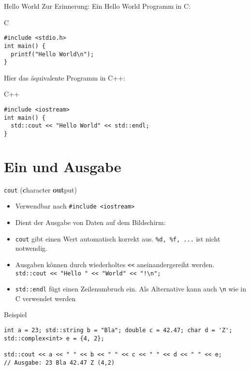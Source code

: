 \documentclass[presentation]{beamer}
\begin{document}
\begin{frame}[label={sec:org5a1b067},fragile]{Hello World}
 Zur Erinnerung: Ein Hello World Programm in C:
\begin{block}{C}
\begin{verbatim}
#include <stdio.h>
int main() {
  printf("Hello World\n");
}
\end{verbatim}
\end{block}
Hier das äquivalente Programm in C++:
\begin{block}{C++}
\begin{verbatim}
#include <iostream>
int main() {
  std::cout << "Hello World" << std::endl;
}
\end{verbatim}
\end{block}
\end{frame}
\section{Ein und Ausgabe}
\label{sec:org1da853d}
\begin{frame}[label={sec:orgd2dbbfe},fragile]{\texttt{cout} (\textbf{c}haracter \textbf{out}put)}
 \begin{itemize}
\item Verwendbar nach {\color{solarizedYellow}\verb!#include <iostream>!}
\item Dient der \alert{Ausgabe} von Daten auf dem Bildschirm: 
\item {\color{solarizedYellow}\verb!cout!} gibt einen Wert \alert{automatisch korrekt} aus. {\color{solarizedYellow}\verb!%d, %f, ...!}
ist nicht notwendig.
\item Ausgaben können durch wiederholtes {\color{solarizedYellow}\verb!<<!} aneinandergereiht werden.\newline
{\color{solarizedYellow}\verb|std::cout << "Hello " << "World" << "!\n";|}
\item {\color{solarizedYellow}\verb!std::endl!} fügt einen Zeilenumbruch ein. Als Alternative kann auch
{\color{solarizedYellow}\verb!\n!} wie in C verwendet werden
\end{itemize}
\begin{block}{Beispiel}
\begin{verbatim}
int a = 23; std::string b = "Bla"; double c = 42.47; char d = 'Z';
std::complex<int> e = {4, 2};

std::cout << a << " " << b << " " << c << " " << d << " " << e;
// Ausgabe: 23 Bla 42.47 Z (4,2)
\end{verbatim}
\end{block}
\end{frame}
\end{document}
